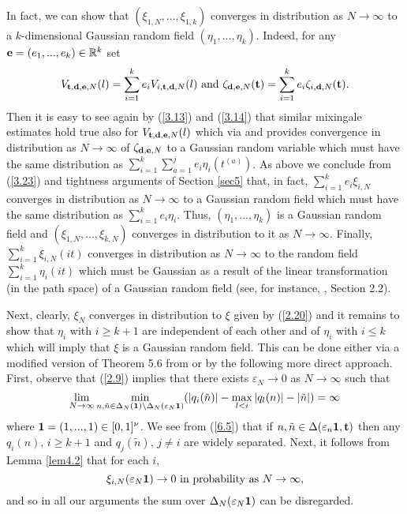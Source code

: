  In fact, we can show that $(\xi_{1,N},...,\xi_{1,k})$ converges in 
 distribution as $N\to\infty$ to a $k$-dimensional Gaussian random 
 field $(\eta_1,...,\eta_k)$. Indeed, for any ${{\bf e}}=(e_1,...,e_k)\in{{\mathbb R}}^k$
 set
 \begin{equation}\label{6.4}
 V_{{{\bf t}},{{\bf d}},{{\bf e}},N}(l)=\sum_{i=1}^ke_iV_{i,{{\bf t}},{{\bf d}},N}(l)\,\,\mbox{and}\,\,
 \zeta_{{{\bf d}},{{\bf e}},N}({{\bf t}})=\sum_{i=1}^ke_i\zeta_{i,{{\bf d}},N}({{\bf t}}).
 \end{equation}
 Then it is easy to see again by (\ref{3.13}) and (\ref{3.14}) that similar
 mixingale estimates hold true also for $V_{{{\bf t}},{{\bf d}},{{\bf e}},N}(l)$ which via
 \cite{ML2} and \cite{Jo} provides convergence in distribution as $N\to
 \infty$ of $\zeta_{{{\bf d}},{{\bf e}},N}$ to a Gaussian random variable which must
 have the same distribution as $\sum_{i=1}^k\sum_{a=1}^je_i\eta_i(t^{(a)})$.
 As above we conclude from (\ref{3.23}) and tightness arguments of Section
 \ref{sec5} that, in fact, $\sum_{i=1}^ke_i\xi_{i,N}$ converges in distribution
 as $N\to\infty$ to a Gaussian random field which must have the same 
 distribution as $\sum_{i=1}^ke_i\eta_i$. Thus, $(\eta_1,...,\eta_k)$ is a
 Gaussian random field and $(\xi_{1,N},...,\xi_{k,N})$ converges in
 distribution to it as $N\to\infty$. Finally, $\sum_{i=1}^k\xi_{i,N}(it)$
 converges in distribution as $N\to\infty$ to the random field
 $\sum_{i=1}^k\eta_i(it)$ which must be Gaussian as a result of the linear
  transformation (in the path space) of a Gaussian random field (see, for
  instance, \cite{Bog}, Section 2.2).
  
  Next, clearly, $\xi_N$ converges in distribution to $\xi$ given by
  (\ref{2.20}) and it remains to show that $\eta_i$ with $i\geq k+1$ are
  independent of each other and of $\eta_i$ with $i\leq k$ which will 
  imply that $\xi$ is a Gaussian random field. This can be done either
  via a modified version of Theorem 5.6 from \cite{KV} or by the following
  more direct approach. First, observe that (\ref{2.9}) implies  that
  there exists ${{\varepsilon}}_N\to 0$ as $N\to\infty$ such that
  \begin{equation}\label{6.5}
  \lim_{N\to\infty}\min_{n,\tilde n\in{{\Delta}}_N({\bf 1})\setminus{{\Delta}}_N
  ({{\varepsilon}}_N{\bf 1})}(|q_i(\tilde n)|-\max_{l<i}|q_l(n)|-|\tilde n|)=\infty
  \end{equation}
  where ${\bf 1}=(1,...,1)\in[0,1]^\nu$. We see from (\ref{6.5}) that if
  $n,\tilde n\in{{\Delta}}({{\varepsilon}}_n\bf 1,t)$ then any $q_i(n),\, i\geq k+1$ and
  $q_j(\tilde n),\, j\ne i$ are widely separated. Next, it follows from 
  Lemma \ref{lem4.2} that for each $i$,
  \begin{equation}\label{6.6}
  \xi_{i,N}({{\varepsilon}}_N{\bf 1})\to 0\,\,\mbox{in probability as}\,\, 
  N\to\infty,
  \end{equation}
  and so in all our arguments the sum over ${{\Delta}}_N({{\varepsilon}}_N{\bf 1})$ can be
   disregarded. 
  

